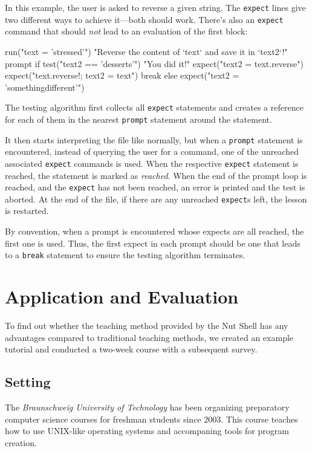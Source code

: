 \documentclass[paper=a4,twoside,abstract=on,cleardoublepage=empty,numbers=noenddot,toc=bib,12pt,appendixprefix=true]{scrreprt}
\begin{document}
In this example, the user is asked to reverse a given string. The \texttt{expect} lines give two different ways to achieve it---both should work. There's also an \texttt{expect} command that should \emph{not} lead to an evaluation of the first block:

\begin{nutsh}
run("text = 'stressed'")
"Reverse the content of `text` and save it in `text2`!"
prompt {
    if test("text2 == 'desserts'") {
        "You did it!"
        expect("text2 = text.reverse")
        expect("text.reverse!; text2 = text")
        break
    } else {
        expect("text2 = 'somethingdifferent'")
    }
}
\end{nutsh}

The testing algorithm first collects all \texttt{expect} statements and creates a reference for each of them in the nearest \texttt{prompt} statement around the statement.

It then starts interpreting the file like normally, but when a \texttt{prompt} statement is encountered, instead of querying the user for a command, one of the unreached associated \texttt{expect} commands is used. When the respective \texttt{expect} statement is reached, the statement is marked as \emph{reached}. When the end of the prompt loop is reached, and the \texttt{expect} has not been reached, an error is printed and the test is aborted. At the end of the file, if there are any unreached \texttt{expect}s left, the lesson is restarted.

By convention, when a prompt is encountered whose expects are all reached, the first one is used. Thus, the first expect in each prompt should be one that leads to a \texttt{break} statement to ensure the testing algorithm terminates.

\chapter{Application and Evaluation}
\label{sec:evaluation}

To find out whether the teaching method provided by the Nut Shell has any advantages compared to traditional teaching methods, we created an example tutorial and conducted a two-week course with a subsequent survey.

\section{Setting}

The \textit{Braunschweig University of Technology} has been organizing preparatory computer science courses for freshman students since 2003. This course teaches how to use UNIX-like operating systems and accompaning tools for program creation.
\end{document}
